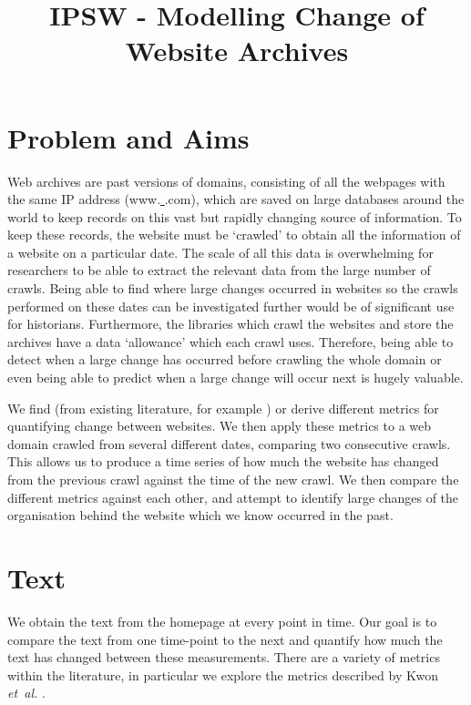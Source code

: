 \documentclass[10pt, a4paper]{article}
\begin{document}
\title{IPSW - Modelling Change of Website Archives}
\author{\vspace{-5ex}}
\date{\vspace{-5ex}}
\maketitle

\vspace{-12mm}

\section{Problem and Aims}

\vspace{-2mm}

 Web archives are past versions of domains, consisting of all the webpages with the same IP address (www.\underline{ }\underline{ }\underline{ }\underline{ }\underline{ }\underline{ }.com), which are saved on large databases around the world to keep records on this vast but rapidly changing source of information.
 To keep these records, the website must be `crawled' to obtain all the information of a website on a particular date.
 The scale of all this data is overwhelming for researchers to be able to extract the relevant data from the large number of crawls.
 Being able to find where large changes occurred in websites so the crawls performed on these dates can be investigated further would be of significant use for historians.
 Furthermore, the libraries which crawl the websites and store the archives have a data `allowance' which each crawl uses.
 Therefore, being able to detect when a large change has occurred before crawling the whole domain or even being able to predict when a large change will occur next is hugely valuable.
 
 We find (from existing literature, for example \cite{dhyani2002survey}) or derive different metrics for quantifying change between websites.
 We then apply these metrics to a web domain crawled from several different dates, comparing two consecutive crawls.
 This allows us to produce a time series of how much the website has changed from the previous crawl against the time of the new crawl.
 We then compare the different metrics against each other, and attempt to identify large changes of the organisation behind the website which we know occurred in the past.
\vspace{-3mm}

\section{Text}
\vspace{-2mm}
We obtain the text from the homepage at every point in time. Our goal is to compare the text from one time-point to the next and quantify how much the text has changed between these measurements. There are a variety of metrics within the literature, in particular we explore the metrics described by Kwon \textit{et~al.} \cite{kwon2006precise}.
\vspace{-2mm}
\end{document}

